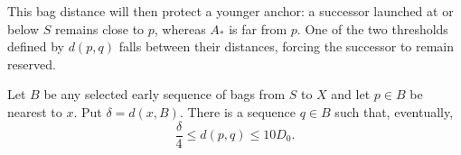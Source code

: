 This bag distance will then protect a younger anchor: a successor
launched at or below $S$ remains close to $p$, whereas $A_*$ is far
from $p$. One of the two thresholds defined by $d(p,q)$ falls between
their distances, forcing the successor to remain reserved.

\begin{lemma}
\label{lem:anchor-obstruction}
Let $B$ be any selected early sequence of bags from $S$ to $X$ and let
$p\in B$ be nearest to $x$.  Put $\delta=d(x,B)$.  There is a sequence
$q\in B$ such that, eventually,
\begin{equation}\label{eq:anchor-obstruction}
 \frac{\delta}{4}\leq d(p,q)\leq10D_0.
\end{equation}
\end{lemma}


